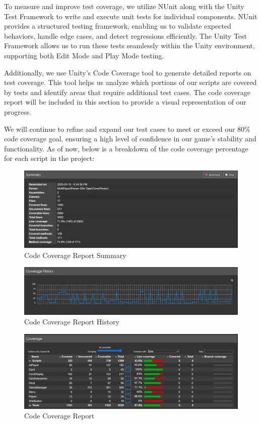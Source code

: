 \documentclass[12pt, titlepage]{article}
\begin{document}
To measure and improve test coverage, we utilize NUnit along with the Unity Test Framework to write and execute unit tests for individual components. NUnit provides a structured testing framework, enabling us to validate expected behaviors, handle edge cases, and detect regressions efficiently. The Unity Test Framework allows us to run these tests seamlessly within the Unity environment, supporting both Edit Mode and Play Mode testing.

Additionally, we use Unity's Code Coverage tool to generate detailed reports on test coverage. This tool helps us analyze which portions of our scripts are covered by tests and identify areas that require additional test cases. The code coverage report will be included in this section to provide a visual representation of our progress.

We will continue to refine and expand our test cases to meet or exceed our 80\% code coverage goal, ensuring a high level of confidence in our game's stability and functionality.
As of now, below is a breakdown of the code coverage percentage for each script in the project:
\begin{figure}[h]
    \centering
    \includegraphics[width=1.1\textwidth]{coverage1.png}  %
    \caption{Code Coverage Report Summary}
    \label{fig:coverage}
\end{figure}
\begin{figure}[h]
    \centering
    \includegraphics[width=1.1\textwidth]{coverage2.png}  %
    \caption{Code Coverage Report History}
    \label{fig:coverage}
\end{figure}
\begin{figure}[h]
    \centering
    \includegraphics[width=1.1\textwidth]{coverage3.png}  %
    \caption{Code Coverage Report}
    \label{fig:coverage}
\end{figure}
\end{document}
